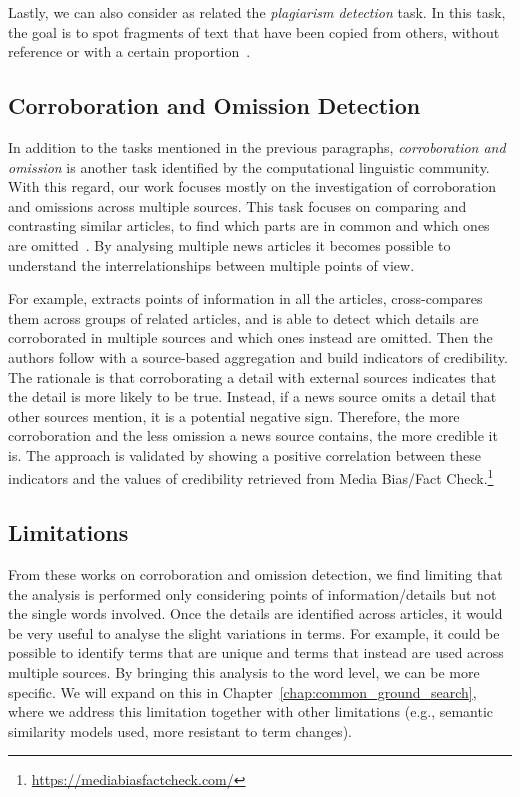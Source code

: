 Lastly, we can also consider as related the \emph{plagiarism detection} task.
In this task, the goal is to spot fragments of text that have been copied from others, without reference or with a certain proportion~\citep{stein2006near,alzahrani2010fuzzy,arabi2022improving}.


\subsection{\statusgreen Corroboration and Omission Detection}
\label{ssec:lit_relationships_corr_omiss}

In addition to the tasks mentioned in the previous paragraphs,
\textit{corroboration and omission}
is another task identified by the computational linguistic community.
With this regard, our work focuses mostly on the investigation of corroboration and omissions
across multiple sources.
This task focuses on comparing and contrasting similar articles, to find which parts are in common and which ones are omitted~\cite{ehrhardt2021omission,bountouridis2018explaining,ko2023claimdiff}.
By analysing multiple news articles it becomes possible to understand the interrelationships between multiple points of view.

For example, \cite{bountouridis2018explaining} extracts points of information in all the articles, cross-compares them across groups of related articles, and is able to detect which details are corroborated in multiple sources and which ones instead are omitted.
Then the authors follow with a source-based aggregation and build indicators of credibility. The rationale is that corroborating a detail with external sources indicates that the detail is more likely to be true.
Instead, if a news source omits a detail that other sources mention, it is a potential negative sign.
Therefore, the more corroboration and the less omission a news source contains, the more credible it is.
The approach is validated by showing a positive correlation between these indicators and the values of credibility retrieved from Media Bias/Fact Check.\footnote{\url{https://mediabiasfactcheck.com/}}

\subsection{\statusgreen Limitations}

From these works on corroboration and omission detection, we find limiting that the analysis is performed only considering points of information/details but not the single words involved.
Once the details are identified across articles, it would be very useful to analyse the slight variations in terms.
For example, it could be possible to identify terms that are unique and terms that instead are used across multiple sources. By bringing this analysis to the word level, we can be more specific.
We will expand on this in Chapter~\ref{chap:common_ground_search}, where we address this limitation together with other limitations (e.g., semantic similarity models used, more resistant to term changes).

